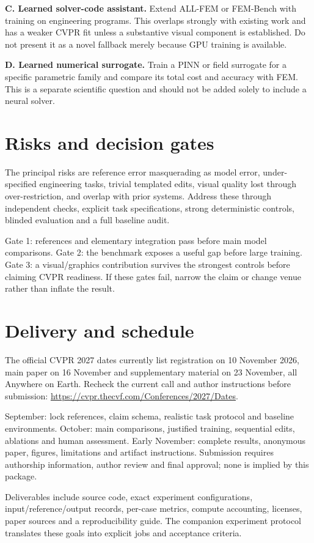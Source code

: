 \documentclass[
  11pt,
  a4paper,
]{article}
\newcounter{none} %
\begin{document}
\textbf{C. Learned solver-code assistant.} Extend ALL-FEM or FEM-Bench
with training on engineering programs. This overlaps strongly with
existing work and has a weaker CVPR fit unless a substantive visual
component is established. Do not present it as a novel fallback merely
because GPU training is available.

\textbf{D. Learned numerical surrogate.} Train a PINN or field surrogate
for a specific parametric family and compare its total cost and accuracy
with FEM. This is a separate scientific question and should not be added
solely to include a neural solver.

\section{Risks and decision gates}\label{risks-and-decision-gates}

The principal risks are reference error masquerading as model error,
under-specified engineering tasks, trivial templated edits, visual
quality lost through over-restriction, and overlap with prior systems.
Address these through independent checks, explicit task specifications,
strong deterministic controls, blinded evaluation and a full baseline
audit.

Gate 1: references and elementary integration pass before main model
comparisons. Gate 2: the benchmark exposes a useful gap before large
training. Gate 3: a visual/graphics contribution survives the strongest
controls before claiming CVPR readiness. If these gates fail, narrow the
claim or change venue rather than inflate the result.

\section{Delivery and schedule}\label{delivery-and-schedule}

The official CVPR 2027 dates currently list registration on 10 November
2026, main paper on 16 November and supplementary material on 23
November, all Anywhere on Earth. Recheck the current call and author
instructions before submission:
\url{https://cvpr.thecvf.com/Conferences/2027/Dates}.

September: lock references, claim schema, realistic task protocol and
baseline environments. October: main comparisons, justified training,
sequential edits, ablations and human assessment. Early November:
complete results, anonymous paper, figures, limitations and artifact
instructions. Submission requires authorship information, author review
and final approval; none is implied by this package.

Deliverables include source code, exact experiment configurations,
input/reference/output records, per-case metrics, compute accounting,
licenses, paper sources and a reproducibility guide. The companion
experiment protocol translates these goals into explicit jobs and
acceptance criteria.
\end{document}
